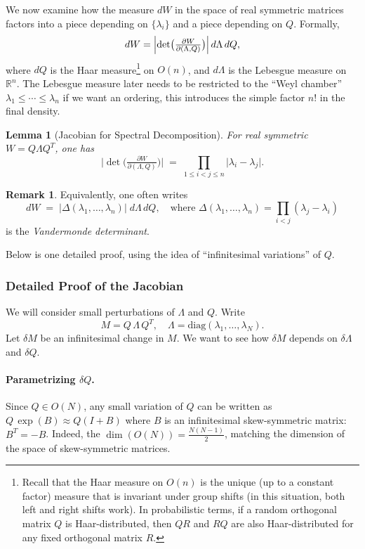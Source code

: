 \documentclass[letterpaper,11pt,oneside,reqno]{article}
\numberwithin{equation}{section}
\newtheorem{lemma}[proposition]{Lemma}
\theoremstyle{definition}
\newtheorem{remark}[proposition]{Remark}
\begin{document}
We now examine how the measure \(dW\) in the space of real symmetric matrices factors into a piece depending on \(\{\lambda_i\}\) and a piece depending on \(Q\).  Formally,
\[
  dW
  = \Bigl|\det\bigl(\tfrac{\partial W}{\partial(\Lambda,Q)}\bigr)\Bigr|
    \,d\Lambda\,dQ,
\]
where \(dQ\) is the Haar measure\footnote{Recall that the
	Haar measure on \(O(n)\) is the unique
	(up to a constant factor) measure that is invariant under
	group shifts (in this situation, both left and right shifts
	work). In probabilistic terms,
	if a random orthogonal matrix $Q$ is Haar-distributed,
	then $QR$ and $RQ$ are also Haar-distributed for any fixed orthogonal
matrix $R$.}
on \(O(n)\), and
\(d\Lambda\) is the Lebesgue measure on \(\mathbb{R}^n\).
The Lebesgue measure later needs to be restricted
to the ``Weyl chamber''
\(\lambda_1\le \cdots\le \lambda_n\) if we want an ordering,
this introduces the simple factor \(n!\) in the final density.


\begin{lemma}[Jacobian for Spectral Decomposition]
\label{thm:Jacobian-GOE}
For real symmetric \(W=Q\Lambda Q^T\), one has
\[
  \bigl|\det\bigl(\tfrac{\partial W}{\partial(\Lambda,Q)}\bigr)\bigr|
  \;=\;
  \prod_{1\le i<j\le n}
  \bigl|\lambda_i - \lambda_j\bigr|.
\]
\end{lemma}

\begin{remark}
Equivalently, one often writes
\[
  dW
  \;=\;
  \bigl|\Delta(\lambda_1,\dots,\lambda_n)\bigr|\;
  d\Lambda\,dQ,
  \quad\text{where }
  \Delta(\lambda_1,\dots,\lambda_n)
  = \prod_{i<j}(\lambda_j-\lambda_i)
\]
is the \emph{Vandermonde determinant}.
\end{remark}

Below is one detailed proof, using the idea of “infinitesimal variations” of \(Q\).

\subsubsection*{Detailed Proof of the Jacobian}

We will consider small perturbations of \(\Lambda\) and \(Q\).  Write
\[
  M = Q\,\Lambda\,Q^T,
  \quad
  \Lambda = \mathrm{diag}(\lambda_1,\dots,\lambda_N).
\]
Let \(\delta M\) be an infinitesimal change in \(M\). We want to see how \(\delta M\) depends on \(\delta\Lambda\) and \(\delta Q\).

\paragraph{Parametrizing \(\delta Q\).}
Since \(Q\in O(N)\), any small variation of \(Q\) can be written as \(Q\,\exp(B)\approx Q(I+B)\) where \(B\) is an infinitesimal skew-symmetric matrix: \(B^T=-B\). Indeed, the \(\dim(O(N)) = \tfrac{N(N-1)}{2}\), matching the dimension of the space of skew-symmetric matrices.
\end{document}

